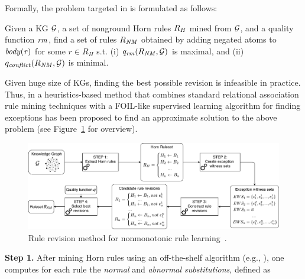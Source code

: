 Formally, the problem targeted in \cite{gad2016,rumis} is formulated as follows: 
\begin{definition} Given a KG $\mathcal{G}$,
a set of nonground Horn rules $R_{\mathit{H}}$ mined from $\mathcal{G}$, and a quality
function $\mathit{rm}$, %
find a set of rules $R_{\mathit{NM}}$ obtained by
adding negated atoms to $\mathit{body(r)}$ for some $r{\in} R_{H}$ s.t. (i)
${q_{\mathit{rm}}(R_{\mathit{NM}},\mathcal{G})}$ is maximal, and (ii)
${q_{\mathit{conflict}}(R_{\mathit{NM}},\mathcal{G})}$ is minimal.
\end{definition}



Given huge size of KGs, finding the best possible revision is infeasible in practice. Thus, in \cite{gad2016,rumis} a heuristics-based method that combines standard relational association rule mining techniques with a FOIL-like supervised learning algorithm \cite{foil} for finding exceptions has been proposed to find an approximate solution to the above problem (see Figure~\ref{fig:iswc_process} for overview). 

\begin{figure}[t]
\centering
\includegraphics[width=1\textwidth]{figures/overview_new}
\caption{Rule revision method for nonmonotonic rule learning~\cite{gad2016,rumis}.}
\label{fig:iswc_process}
\end{figure}
\noindent \textbf{Step 1.} After mining Horn rules using an off-the-shelf algorithm (e.g.,
 \cite{amie}), %
 one computes for each rule the \emph{normal} and
\emph{abnormal substitutions}, defined as

